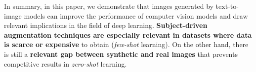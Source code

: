 In summary, in this paper, we demonstrate that images generated by text-to-image models can improve the performance of computer vision models and draw relevant implications in the field of deep learning. \textbf{Subject-driven augmentation techniques are especially relevant in datasets where data is scarce or expensive} to obtain (\textit{few-shot} learning). On the other hand, there is still a \textbf{relevant gap between synthetic and real images} that prevents competitive results in \textit{zero-shot} learning.
